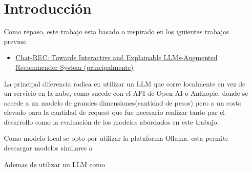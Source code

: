 \documentclass[11pt,a4paper,twoside]{thesis}
\begin{document}

\def\autor{Adrian Norberto Marino}
\def\tituloTesis{Chatbot para recomendacion personalizada de contenido}
\def\runtitulo{Resumen}
\def\runtitle{Chatbot para recomendacion personalizada de contenido}
\def\director{Roberto Abalde}

\def\lugar{Buenos Aires, Argentina, 2024}


%
\frontmatter
\pagestyle{empty}

%
%
\cleardoublepage
%
%
%
\tableofcontents
%
%
\mainmatter
\pagestyle{headings}
%
%
%
%


\chapter{Introducción}

Como repaso, este trabajo esta basado o inspirado en los iguientes
trabajos previos:

\begin{itemize}
    \item \href{https://arxiv.org/abs/2303.14524}{Chat-REC: Towards Interactive and Explainable LLMs-Augmented Recommender System (principalmente)} ~\cite{chatrec}
\end{itemize}

La principal diferencia radica en utilizar un LLM que corre localmente
en vez de un servicio en la nube, como sucede con el API de Open AI o Anthopic, donde
se accede a un modelo de grandes dimensiones(cantidad de pesos) pero a un costo
elevado para la cantidad de request que fue necesario realizar tanto par el
desarrollo como la evaluación de los modelos abordados en este trabajo.

Como modelo local se opto por utilizar la plataforma Ollama. esta permite descargar modelos similares a

Ademas de utilizar un LLM como
\end{document}
